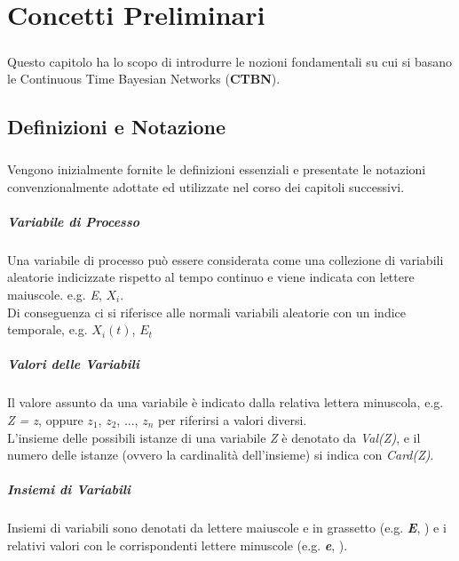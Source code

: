 \chapter{Concetti Preliminari}
  \label{chapter_concetti_preliminari}
  \paragraph{}
  Questo capitolo ha lo scopo di introdurre le nozioni fondamentali su cui si
  basano le Continuous Time Bayesian Networks (\textbf{CTBN}).

  \section{Definizioni e Notazione}
  \paragraph{}
  Vengono inizialmente fornite le definizioni essenziali e presentate le notazioni convenzionalmente 
  adottate ed utilizzate nel corso dei capitoli successivi.

  \paragraph{Variabile di Processo} \cite{nodelman-2007}
  Una variabile di processo può essere considerata come una collezione di variabili aleatorie
  indicizzate rispetto al tempo continuo e viene indicata con lettere maiuscole.
  e.g. \textit{E}, \textit{$X_i$}.\\    
  Di conseguenza ci si riferisce alle normali variabili aleatorie con un indice temporale,
  e.g. \textit{$X_{i}(t)$}, \textit{$E_t$}

  \paragraph{Valori delle Variabili}
  Il valore assunto da una variabile è indicato dalla relativa lettera minuscola, e.g. \textit{Z = z}, oppure
  $z_1$, $z_2$, ..., $z_n$ per riferirsi a valori diversi.\\
  L'insieme delle possibili istanze di una variabile \textit{Z} è denotato da \textit{Val(Z)},
  e il numero delle istanze (ovvero la cardinalità dell'insieme) si indica con \textit{Card(Z)}.

  \paragraph{Insiemi di Variabili}
  Insiemi di variabili sono denotati da lettere maiuscole e in grassetto (e.g. \textit{\textbf{E}},
  ) e i relativi valori con le corrispondenti lettere minuscole (e.g. \textit{\textbf{e}},
  ).


